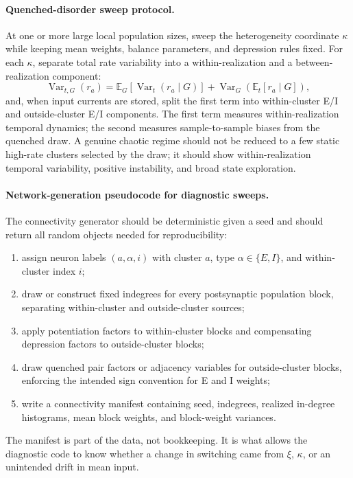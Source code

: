 \paragraph{Quenched-disorder sweep protocol.}
At one or more large local population sizes, sweep the heterogeneity coordinate
\(\kappa\) while keeping mean weights, balance parameters, and depression rules
fixed. For each \(\kappa\), separate total rate variability into a
within-realization and a between-realization component:
\begin{equation}
    \operatorname{Var}_{t,G}(r_a)
    =
    \mathbb E_G[\operatorname{Var}_t(r_a\mid G)]
    +
    \operatorname{Var}_G(\mathbb E_t[r_a\mid G]),
    \label{eq:ch09-time-realization-variance-split}
\end{equation}
and, when input currents are stored, split the first term into
within-cluster E/I and outside-cluster E/I components. The first term measures
within-realization temporal dynamics; the second measures sample-to-sample
biases from the quenched draw. A genuine chaotic regime should not be reduced
to a few static high-rate clusters selected by the draw; it should show
within-realization temporal variability, positive instability, and broad state
exploration.

\paragraph{Network-generation pseudocode for diagnostic sweeps.}
The connectivity generator should be deterministic given a seed and should
return all random objects needed for reproducibility:
\begin{enumerate}
    \item assign neuron labels \((a,\alpha,i)\) with cluster \(a\), type
    \(\alpha\in\{E,I\}\), and within-cluster index \(i\);
    \item draw or construct fixed indegrees for every postsynaptic population
    block, separating within-cluster and outside-cluster sources;
    \item apply potentiation factors to within-cluster blocks and compensating
    depression factors to outside-cluster blocks;
    \item draw quenched pair factors or adjacency variables for outside-cluster
    blocks, enforcing the intended sign convention for E and I weights;
    \item write a connectivity manifest containing seed, indegrees, realized
    in-degree histograms, mean block weights, and block-weight variances.
\end{enumerate}
The manifest is part of the data, not bookkeeping. It is what allows the
diagnostic code to know whether a change in switching came from \(\xi\),
\(\kappa\), or an unintended drift in mean input.


